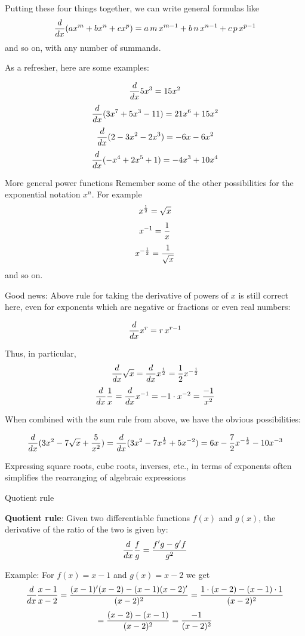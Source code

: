\begin{frame}
    Putting these four things together, we can write general formulas like
    $${d\over dx}(ax^m+bx^n+cx^p)=a\,m\,x^{m-1}+b\,n\,x^{n-1}+c\,p\,x^{p-1}$$
    and so on, with any number of summands.

    As a refresher, here are some examples:

    $${d\over dx}5x^3=15x^2$$
    $${d\over dx}(3x^7+5x^3-11)=21x^6+15x^2$$
    $${d\over dx}(2-3x^2-2x^3)=-6x-6x^2$$
    $${d\over dx}(-x^4+2x^5+ 1)=-4x^3+10x^4$$
\end{frame}

\begin{frame}{More general power functions}
    Remember some of the other possibilities for the exponential notation $x^n$. For example
    $$x^{{1\over 2}}=\sqrt{x}$$
    $$x^{-1}={1\over x}$$
    $$x^{-{1\over 2}}={ 1 \over \sqrt{x }}$$
    and so on.

    Good news: Above rule for taking
    the derivative of powers of $x$ is still correct here, even for
    exponents which are negative or fractions or even real numbers:

    $$ {d\over dx}x^r=r\,x^{r-1}$$
\end{frame}

\begin{frame}
    Thus, in particular,
    $${d\over dx}\sqrt{x}=
        {d\over dx}x^{{1\over 2}}={1\over 2}x^{-{1\over 2}}$$
    $${d\over dx}{1\over x}={d\over dx}x^{-1}=-1\cdot
        x^{-2}={-1\over x^2}$$

    When combined with the sum rule from above, we have the
    obvious possibilities:

    $${d\over dx}(3x^2-7\sqrt{x}+{5\over x^2})=
        {d\over dx}(3x^2-7x^{{1\over 2}}+5x^{-2})=
        6x-{7\over 2}x^{-{1\over 2}}-10x^{-3}$$

    \begin{boxed}
        Expressing square roots, cube roots, inverses,
        etc., in terms of exponents often simplifies
        the rearranging of algebraic expressions
    \end{boxed}

\end{frame}

\begin{frame}{Quotient rule}
    \begin{boxed}
        \textbf{Quotient rule}:
        Given two differentiable functions $f(x)$ and $g(x)$, the derivative of the
        ratio of the two is given by:
        $${d\over dx}{f\over g}={f'g-g'f\over g^2}$$
    \end{boxed}

    Example: For $f(x) = x-1$ and $g(x) = x-2$ we get
    $${d\over dx}{x-1\over x-2}=
        {(x-1)'(x-2)-(x-1)(x-2)'\over (x-2)^2}=
        {1\cdot(x-2)-(x-1)\cdot 1\over (x-2)^2}$$
    $$=
        {(x-2)-(x-1)\over (x-2)^2}=
        {-1\over (x-2)^2}$$
\end{frame}

